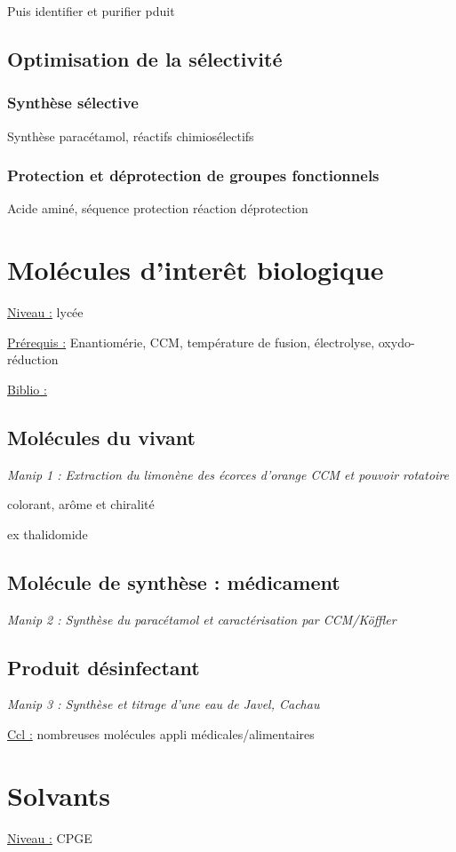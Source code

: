 \documentclass{article}%
\begin{document}
Puis identifier et  purifier pduit

\subsection{Optimisation de la sélectivité}
\subsubsection{Synthèse sélective}

Synthèse paracétamol, réactifs chimiosélectifs

\subsubsection{Protection et déprotection de groupes fonctionnels}
Acide aminé, séquence protection réaction déprotection
\section{Molécules d'interêt biologique}
\underline{Niveau :} lycée

\underline{Prérequis :} Enantiomérie, CCM, température de fusion, électrolyse, oxydo-réduction

\underline{Biblio :} 
\subsection{Molécules du vivant}
\textit{Manip 1 : Extraction du limonène des écorces d'orange CCM et pouvoir rotatoire}

colorant, arôme et chiralité

ex thalidomide
\subsection{Molécule de synthèse : médicament}

\textit{Manip 2 : Synthèse du paracétamol et caractérisation par CCM/Köffler}

\subsection{Produit désinfectant}

\textit{Manip 3 : Synthèse et titrage d'une eau de Javel, Cachau}

\underline{Ccl :} nombreuses molécules appli médicales/alimentaires

\section{Solvants}
\underline{Niveau :} CPGE 
\end{document}
